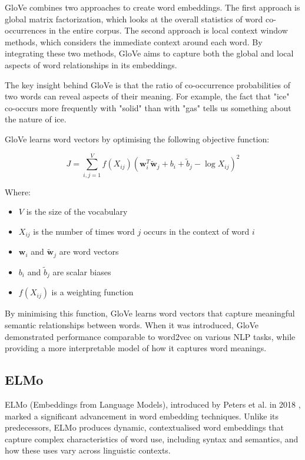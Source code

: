 \documentclass[a4paper, oneside]{discothesis}
\begin{document}
GloVe combines two approaches to create word embeddings. The first approach is global matrix factorization, which looks at the overall statistics of word co-occurrences in the entire corpus. The second approach is local context window methods, which considers the immediate context around each word. By integrating these two methods, GloVe aims to capture both the global and local aspects of word relationships in its embeddings.

The key insight behind GloVe is that the ratio of co-occurrence probabilities of two words can reveal aspects of their meaning. For example, the fact that "ice" co-occurs more frequently with "solid" than with "gas" tells us something about the nature of ice.

GloVe learns word vectors by optimising the following objective function:

\begin{equation}
J = \sum_{i,j=1}^V f(X_{ij})(\mathbf{w}_i^T\tilde{\mathbf{w}}_j + b_i + \tilde{b}_j - \log X_{ij})^2
\end{equation}

Where:
\begin{itemize}
    \item $V$ is the size of the vocabulary
    \item $X_{ij}$ is the number of times word $j$ occurs in the context of word $i$
    \item $\mathbf{w}_i$ and $\tilde{\mathbf{w}}_j$ are word vectors
    \item $b_i$ and $\tilde{b}_j$ are scalar biases
    \item $f(X_{ij})$ is a weighting function
\end{itemize}

By minimising this function, GloVe learns word vectors that capture meaningful semantic relationships between words. When it was introduced, GloVe demonstrated performance comparable to word2vec on various NLP tasks, while providing a more interpretable model of how it captures word meanings.

\subsection{ELMo}
ELMo (Embeddings from Language Models), introduced by Peters et al. in 2018 \cite{peters2018deep}, marked a significant advancement in word embedding techniques. Unlike its predecessors, ELMo produces dynamic, contextualised word embeddings that capture complex characteristics of word use, including syntax and semantics, and how these uses vary across linguistic contexts.
\end{document}
